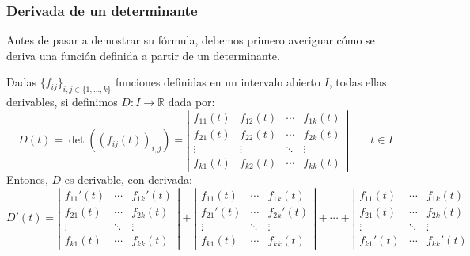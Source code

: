 \subsubsection{Derivada de un determinante}
Antes de pasar a demostrar su fórmula, debemos primero averiguar cómo se deriva una función definida a partir de un determinante.

\begin{prop}
    Dadas $\{f_{ij}\}_{i,j \in \{1,\ldots,k\}}$ funciones definidas en un intervalo abierto $I$, todas ellas derivables, si definimos $D:I\rightarrow\mathbb{R}$ dada por:
    \begin{equation*}
        D(t) = \det((f_{ij}(t))_{i,j}) = \left|\begin{array}{cccc}
            f_{11}(t) & f_{12}(t) & \cdots & f_{1k}(t) \\
            f_{21}(t) & f_{22}(t) & \cdots & f_{2k}(t) \\
            \vdots & \vdots & \ddots & \vdots \\
            f_{k1}(t) & f_{k2}(t) & \cdots & f_{kk}(t) 
        \end{array}\right| \qquad t\in I
    \end{equation*}
    Entones, $D$ es derivable, con derivada:
    \begin{equation*}
        D'(t) = \left|\begin{array}{ccc}
            f_{11}'(t) & \cdots & f_{1k}'(t) \\
            f_{21}(t) & \cdots & f_{2k}(t) \\
            \vdots & \ddots & \vdots \\
            f_{k1}(t) & \cdots & f_{kk}(t) 
        \end{array}\right| + 
        \left|\begin{array}{ccc}
            f_{11}(t) & \cdots & f_{1k}(t) \\
            f_{21}'(t) & \cdots & f_{2k}'(t) \\
            \vdots & \ddots & \vdots \\
            f_{k1}(t) & \cdots & f_{kk}(t) 
        \end{array}\right| + \cdots + 
        \left|\begin{array}{ccc}
            f_{11}(t) & \cdots & f_{1k}(t) \\
            f_{21}(t) & \cdots & f_{2k}(t) \\
            \vdots & \ddots & \vdots \\
            f_{k1}'(t) & \cdots & f_{kk}'(t) 

\end{array}
\end{equation*}
\end{prop}
